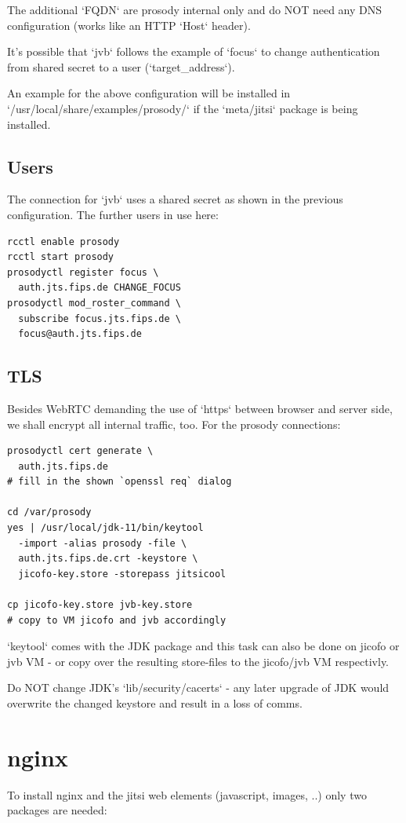 \documentclass[10pt,conference]{IEEEtran}
\begin{document}
The additional `FQDN` are prosody internal only and
do NOT need any DNS configuration (works like an
HTTP `Host` header).

It's possible that `jvb` follows the example of
`focus` to change authentication from shared secret
to a user (`target_address`).

An example for the above configuration will be installed
in `/usr/local/share/examples/prosody/` if the `meta/jitsi`
package is being installed.

\subsection{Users}
The connection for `jvb` uses a shared secret as shown in the previous configuration.
The further users in use here:

\begin{verbatim}
rcctl enable prosody
rcctl start prosody
prosodyctl register focus \
  auth.jts.fips.de CHANGE_FOCUS
prosodyctl mod_roster_command \
  subscribe focus.jts.fips.de \
  focus@auth.jts.fips.de
\end{verbatim}

\subsection{TLS}
Besides WebRTC demanding the use of `https` between browser and server side, we shall
encrypt all internal traffic, too. For the prosody connections:

\begin{verbatim}
prosodyctl cert generate \
  auth.jts.fips.de
# fill in the shown `openssl req` dialog

cd /var/prosody
yes | /usr/local/jdk-11/bin/keytool
  -import -alias prosody -file \
  auth.jts.fips.de.crt -keystore \
  jicofo-key.store -storepass jitsicool

cp jicofo-key.store jvb-key.store
# copy to VM jicofo and jvb accordingly
\end{verbatim}

`keytool` comes with the JDK package and this task can also be done on jicofo or jvb VM
- or copy over the resulting store-files to the jicofo/jvb VM respectivly.

Do NOT change JDK's `lib/security/cacerts` - any later upgrade of JDK
would overwrite the changed keystore and result in a loss of comms.

\section{nginx}
To install nginx and the jitsi web elements (javascript, images, ..) only two packages
are needed:
\end{document}
